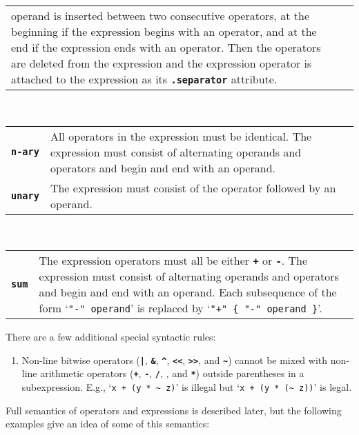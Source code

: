 \documentclass[12pt]{article}
\newcommand{\TT}[1]{{\tt \bfseries #1}}
\newcommand{\ttkey}[1]{{\tt \bfseries #1}}
\begin{document}
\begin{center}
\begin{tabular}{p{1in}p{5.0in}}
      operand is inserted between two consecutive operators,
      at the beginning if the expression begins with an operator,
      and at the end if the expression ends with an operator.
      Then the operators are deleted from the expression and
      the expression operator is attached
      to the expression as its \TT{.separator} attribute.
\end{tabular}
\\[0.5ex]
\begin{tabular}{p{1in}p{5.0in}}
\ttkey{n-ary}
    & All operators in the expression must be identical.
      The expression must consist of alternating operands
      and operators and begin and end with an operand.
\\[1ex]
\ttkey{unary}
    & The expression must consist of
      the operator followed by an operand.
\end{tabular}
\\[0.5ex]
\begin{tabular}{p{1in}p{5.0in}}
\ttkey{sum}
    & The expression operators must all be either \TT{+} or \TT{-}.
      The expression must consist of alternating operands
      and operators and begin and end with an operand.
      Each subsequence of the form `{\tt "-" operand}' is
      replaced by `{\tt "+" \{ "-" operand \}}'.
\end{tabular}
\end{center}

There are a few additional special syntactic rules:
\begin{enumerate}
\item Non-line bitwise operators (\TT{|}, \TT{\&}, \TT{\textasciicircum},
\TT{<{}<}, \TT{>{}>}, and \TT{\textasciitilde}) cannot be mixed
with non-line arithmetic operators
(\TT{+}, \TT{-}, \TT{/}, \TT{*}, and \TT{**})
outside parentheses in a subexpression.
E.g., `{\tt x + (y * \textasciitilde{} z)}'
is illegal but `{\tt x + (y * (\textasciitilde{} z))}' is legal.
\end{enumerate}


Full semantics of operators and expressions is described later,
but the following examples give an idea of some of this semantics:
\end{document}
